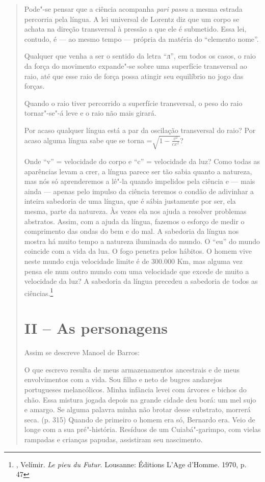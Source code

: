 \begin{quote}
Pode"-se pensar que a ciência acompanha \emph{pari passu} a mesma estrada
percorria pela língua. A lei universal de Lorentz diz que um corpo se
achata na direção transversal à pressão a que ele é submetido. Essa lei,
contudo, é --- ao mesmo tempo --- própria da matéria do ``elemento nome''.

Qualquer que venha a ser o sentido da letra ``л'', em todos os casos, o
raio da força do movimento expande"-se sobre uma superfície transversal
ao raio, até que esse raio de força possa atingir seu equilíbrio no jogo
das forças.

Quando o raio tiver percorrido a superfície transversal, o peso do raio
tornar"-se"-á leve e o raio não mais girará.

Por acaso qualquer língua está a par da oscilação transversal do raio?
Por acaso alguma língua sabe que  se torna =$\sqrt{1-\frac{v^{2}}{cx^{2}}}$?

Onde ``v'' =
velocidade do corpo e ``c'' = velocidade da luz? Como todas as
aparências levam a crer, a língua parece ser tão sabia quanto a
natureza, mas nós só aprenderemos a lê"-la quando impelidos pela ciência
e --- mais ainda --- apenas pelo impulso da ciência teremos o condão de
adivinhar a inteira sabedoria de uma língua, que é sábia justamente por
ser, ela mesma, parte da natureza. Às vezes ela nos ajuda a resolver
problemas abstratos. Assim, com a ajuda da língua, fazemos o esforço de
medir o comprimento das ondas do bem e do mal. A sabedoria da língua nos
mostra há muito tempo a natureza iluminada do mundo. O ``eu'' do mundo
coincide com a vida da lua. O fogo penetra pelos hábitos. O homem vive
neste mundo cuja velocidade limite é de 300.000 Km, mas alguma vez pensa
ele num outro mundo com uma velocidade que excede de muito a velocidade
da luz? A sabedoria da língua precedeu a sabedoria de todos as
ciências.\footnote{, Velímir. \emph{Le pieu du Futur}.
  Lousanne: Éditions L'Age d'Homme. 1970, p. 47}

\section{II -- As personagens}

Assim se descreve Manoel de Barros:

O que escrevo resulta de meus armazenamentos ancestrais e de meus
envolvimentos com a vida. Sou filho e neto de bugres andarejos
portugueses melancólicos. Minha infância levei com árvores e bichos do
chão. Essa mistura jogada depois na grande cidade deu borá: um mel sujo
e amargo. Se alguma palavra minha não brotar desse substrato, morrerá
seca. (p. 315) Quando de primeiro o homem era só, Bernardo era. Veio de
longe com a sua pré"-história. Resíduos de um Cuiabá"-garimpo, com vielas
rampadas e crianças papudas, assistiram seu nascimento.


\end{quote}
